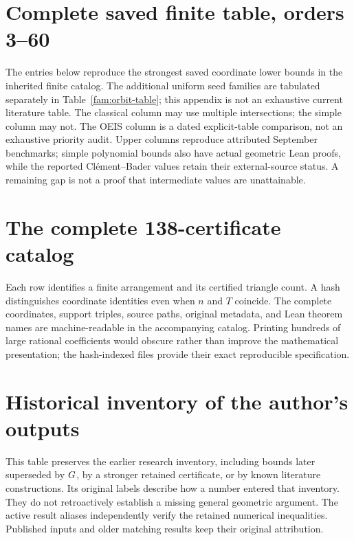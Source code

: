 \section{Complete saved finite table, orders 3--60}\label{app:finite-table}

The entries below reproduce the strongest saved coordinate lower bounds
in the inherited finite catalog. The additional uniform seed families
are tabulated separately in Table~\ref{fam:orbit-table}; this appendix is
not an exhaustive current literature table. The classical column may use
multiple intersections; the simple column may not. The OEIS column is a
dated explicit-table comparison, not an exhaustive priority audit. Upper
columns reproduce attributed September benchmarks; simple polynomial
bounds also have actual geometric Lean proofs, while the reported
Cl\'ement--Bader values retain their external-source status. A remaining
gap is not a proof that intermediate values are unattainable.



\section{The complete 138-certificate catalog}\label{app:catalog}

Each row identifies a finite arrangement and its certified triangle count. A hash distinguishes coordinate identities even when $n$ and $T$ coincide. The complete coordinates, support triples, source paths, original metadata, and Lean theorem names are machine-readable in the accompanying catalog. Printing hundreds of large rational coefficients would obscure rather than improve the mathematical presentation; the hash-indexed files provide their exact reproducible specification.



\section{Historical inventory of the author's outputs}\label{app:historical}

This table preserves the earlier research inventory, including bounds later superseded by $G$, by a stronger retained certificate, or by known literature constructions. Its original labels describe how a number entered that inventory. They do not retroactively establish a missing general geometric argument. The active result aliases independently verify the retained numerical inequalities. Published inputs and older matching results keep their original attribution.

